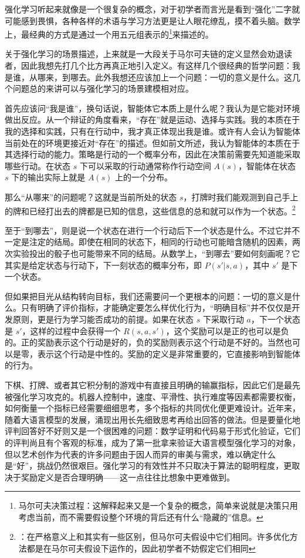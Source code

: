 强化学习听起来就像是一个很复杂的概念，对于初学者而言光是看到“强化”二字就可能感到畏惧，各种各样的术语与学习方法更是让人眼花缭乱，摸不着头脑。数学上，最经典的方式是通过一个用五元组表示的\footnote{马尔可夫决策过程：这解释起来又是一个复杂的概念，简单来说就是决策只用考虑当前，而不需要假设整个环境的背后还有什么“隐藏的”信息。}来描述的。

关于强化学习的场景描述，上来就是一大段关于马尔可夫链的定义显然会劝退读者，因此我想先打几个比方再真正地引入定义。有这样几个很经典的哲学问题：我是谁，从哪来，到哪去。此外我想还应该加上一个问题：一切的意义是什么。这几个问题总的来讲可以与强化学习的场景建模相对应。

首先应该问“我是谁”，换句话说，智能体它本质上是什么呢？我认为是它能对环境做出反应。从一个辩证的角度看来，“存在”就是运动、选择与实践。我的本质在于我的选择和实践，只有在行动中，我才真正体现出我是谁。或许有人会认为智能体当前处在的环境更接近对“存在”的描述。但如前文所述，我认为智能体的本质在于其选择行动的能力。策略是行动的一个概率分布，因此在决策前需要先知道能采取哪些行动。在状态 $s$ 下可以采取的行动通常称作行动空间 $A(s)$，智能体在状态 $s$ 下的输出实际上就是 $A(s)$ 上的一个分布。

那么“从哪来”的问题呢？这就是当前所处的状态 $s$，打牌时我们能观测到自己手上的牌和已经打出去的牌都是已知的信息，这些信息的总和就可以作为一个状态。\footnote{：在严格意义上和其实有一些区别，但马尔可夫假设中它们相同。许多优化方法都是在马尔可夫假设下运作的，因此初学者不妨假定它们相同}

至于“到哪去”，则是说一个状态在进行一个行动后下一个状态是什么。不过它并不一定是注定的结局。即使在相同的状态下，相同的行动也可能暗含随机的因素，两次实验投出的骰子也可能带来不同的结局。从数学上，“到哪去”要如何刻画呢？它其实是给定状态与行动下，下一刻状态的概率分布，即 $P(s'|s,a)$，其中 $s'$ 是下一个状态。

但如果把目光从结构转向目标，我们还需要问一个更根本的问题：一切的意义是什么。只有明确了评价指标，才能确定要怎么样优化行为，“明确目标”并不仅仅是开发原则，更是行为学习能否成功的前提。如果在状态 $s$ 下采取行动 $a$，下一个状态是 $s'$，这样的过程中会获得一个 $R(s,a,s')$，这个奖励可以是正的也可以是负的。正的奖励表示这个行动是好的，负的奖励则表示这个行动是不好的。当然也可以是零，表示这个行动是中性的。奖励的定义是非常重要的，它直接影响到智能体的行为。

下棋、打牌、或者其它积分制的游戏中有直接且明确的输赢指标，因此它们是最先被强化学习攻克的。机器人控制中，速度、平滑性、执行难度等因素都需要权衡，如何衡量一个指标已经需要细细思考，多个指标的共同优化便更难设计。近年来，随着大语言模型的发展，涌现出用长先细致思考再给出回答的做法。但是要量化地评判回答好不好则又是一个很困难的问题：数学证明和代码易于形式化验证，它们的评判尚且有个客观的标准，成为了第一批拿来验证大语言模型强化学习的对象，但以艺术创作为代表的许多问题由于因人而异的审美与需求，难以确定什么是“好”，挑战仍然很艰巨。强化学习的有效性并不只取决于算法的聪明程度，更取决于奖励定义是否合理明确——这一点往往比想象中更难做到。

